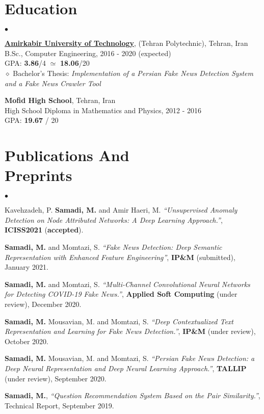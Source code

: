 \documentclass[margin,line]{res}
\newenvironment{list2}{
\begin{list}{$\bullet$}{
		\setlength{\itemsep}{0in}
		\setlength{\parsep}{0in} \setlength{\parskip}{0in}
		\setlength{\topsep}{0in} \setlength{\partopsep}{0in} 
		\setlength{\leftmargin}{0.2in}}}{\end{list}}
\begin{document}
\begin{resume}
	\section{\sc Education}
	\begin{list2}
		\item {\href{https://ce.aut.ac.ir/en}{\textbf{Amirkabir University of Technology}}, (Tehran Polytechnic), Tehran, Iran} \\
		B.Sc., Computer Engineering, 2016 - 2020 (expected) \\
		GPA: \textbf{3.86}/4 $\simeq$ \textbf{18.06}/20\\
		$\diamond$ Bachelor’s Thesis: \textit{Implementation of a Persian Fake News Detection System and a Fake News Crawler Tool}
		\item \textbf{Mofid High School}, Tehran, Iran \\
		High School Diploma in Mathematics and Physics, 2012 - 2016 \\
		GPA: \textbf{19.67} / 20
	\end{list2}
	
	\section{\sc Publications And \\ Preprints}
	\begin{list2}
		\item Kavehzadeh, P. \textbf{Samadi, M.} and Amir Haeri, M. \textit{``Unsupervised Anomaly Detection on Node Attributed Networks: A Deep Learning Approach.''}, \textbf{ICISS2021} (\textbf{accepted}).
		\item \textbf{Samadi, M.} and Momtazi, S. \textit{``Fake News Detection: Deep Semantic Representation with Enhanced Feature Engineering''}, \textbf{IP\&M} (submitted), January 2021.
		\item \textbf{Samadi, M.} and Momtazi, S. \textit{``Multi-Channel Convolutional Neural Networks for Detecting COVID-19 Fake News.''}, \textbf{Applied Soft Computing} (under review), December 2020.	
		\item \textbf{Samadi, M.} Mousavian, M. and Momtazi, S. \textit{``Deep Contextualized Text Representation and Learning for Fake News Detection.''}, \textbf{IP\&M} (under review), October 2020.
		\item \textbf{Samadi, M.} Mousavian, M. and Momtazi, S. \textit{``Persian Fake News Detection: a Deep Neural Representation and Deep Neural Learning Approach.''}, \textbf{TALLIP} (under review), September 2020.
		\item \textbf{Samadi, M.}, \textit{``Question Recommendation System Based on the Pair Similarity.''}, Technical Report, September 2019.
	\end{list2}
	

\end{resume}
\end{document}
